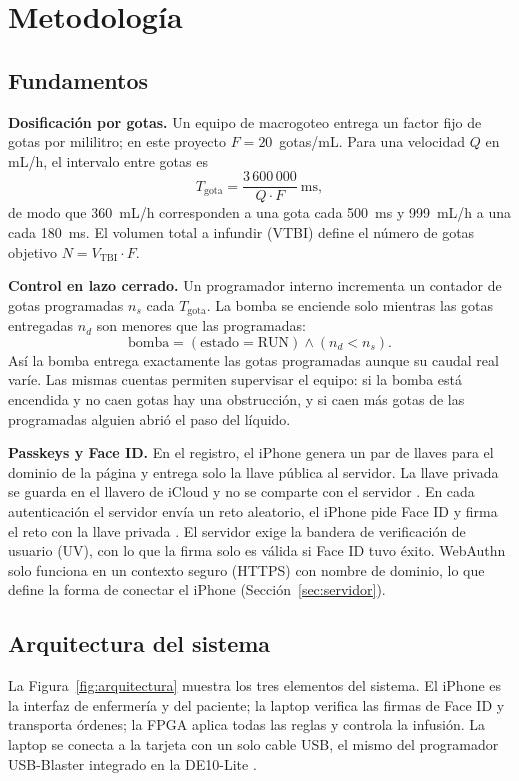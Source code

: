 \documentclass[11pt,letterpaper]{article}
\begin{document}
\section{Metodología}\label{sec:metodologia}

\subsection{Fundamentos}
\textbf{Dosificación por gotas.} Un equipo de macrogoteo entrega un factor fijo de gotas por mililitro; en este proyecto $F = 20$~gotas/mL. Para una velocidad $Q$ en mL/h, el intervalo entre gotas es
\begin{equation}
T_{\text{gota}} = \frac{3\,600\,000}{Q \cdot F}\ \text{ms},
\label{eq:intervalo}
\end{equation}
de modo que 360~mL/h corresponden a una gota cada 500~ms y 999~mL/h a una cada 180~ms. El volumen total a infundir (VTBI) define el número de gotas objetivo $N = V_{\text{TBI}} \cdot F$.

\textbf{Control en lazo cerrado.} Un programador interno incrementa un contador de gotas programadas $n_s$ cada $T_{\text{gota}}$. La bomba se enciende solo mientras las gotas entregadas $n_d$ son menores que las programadas:
\begin{equation}
\text{bomba} = (\text{estado} = \text{RUN}) \land (n_d < n_s).
\label{eq:bomba}
\end{equation}
Así la bomba entrega exactamente las gotas programadas aunque su caudal real varíe. Las mismas cuentas permiten supervisar el equipo: si la bomba está encendida y no caen gotas hay una obstrucción, y si caen más gotas de las programadas alguien abrió el paso del líquido.

\textbf{Passkeys y Face ID.} En el registro, el iPhone genera un par de llaves para el dominio de la página y entrega solo la llave pública al servidor. La llave privada se guarda en el llavero de iCloud y no se comparte con el servidor \cite{apple_passkeys}. En cada autenticación el servidor envía un reto aleatorio, el iPhone pide Face ID y firma el reto con la llave privada \cite{webauthn,apple_biometric}. El servidor exige la bandera de verificación de usuario (UV), con lo que la firma solo es válida si Face ID tuvo éxito. WebAuthn solo funciona en un contexto seguro (HTTPS) con nombre de dominio, lo que define la forma de conectar el iPhone (Sección~\ref{sec:servidor}).

\subsection{Arquitectura del sistema}
La Figura~\ref{fig:arquitectura} muestra los tres elementos del sistema. El iPhone es la interfaz de enfermería y del paciente; la laptop verifica las firmas de Face ID y transporta órdenes; la FPGA aplica todas las reglas y controla la infusión. La laptop se conecta a la tarjeta con un solo cable USB, el mismo del programador USB-Blaster integrado en la DE10-Lite \cite{de10lite}.
\end{document}
